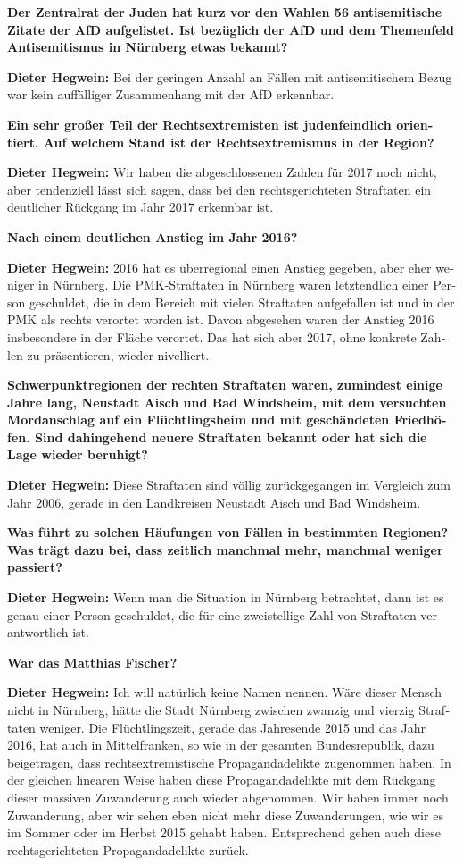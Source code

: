 \begin{otherlanguage}{ngerman}
\textbf{Der Zentralrat der Juden hat kurz vor den Wahlen 56 antisemitische Zitate der AfD aufgelistet. Ist bezüglich der AfD und dem Themenfeld Antisemitismus in Nürnberg etwas bekannt?}

\textbf{Dieter Hegwein:} Bei der geringen Anzahl an Fällen mit antisemitischem Bezug war kein auffälliger Zusammenhang mit der AfD erkennbar. 

\textbf{Ein sehr großer Teil der Rechtsextremisten ist judenfeindlich orientiert. Auf welchem Stand ist der Rechtsextremismus in der Region?}

\textbf{Dieter Hegwein:} Wir haben die abgeschlossenen Zahlen für 2017 noch nicht, aber tendenziell lässt sich sagen, dass bei den rechtsgerichteten Straftaten ein deutlicher Rückgang im Jahr 2017 erkennbar ist.

\textbf{Nach einem deutlichen Anstieg im Jahr 2016?}

\textbf{Dieter Hegwein:} 2016 hat es überregional einen Anstieg gegeben, aber eher weniger in Nürnberg. Die PMK-Straftaten in Nürnberg waren letztendlich einer Person geschuldet, die in dem Bereich mit vielen Straftaten aufgefallen ist und in der PMK als rechts verortet worden ist. Davon abgesehen waren der Anstieg 2016 insbesondere in der Fläche verortet. Das hat sich aber 2017, ohne konkrete Zahlen zu präsentieren, wieder nivelliert.

\textbf{Schwerpunktregionen der rechten Straftaten waren, zumindest einige Jahre lang, Neustadt Aisch und Bad Windsheim, mit dem versuchten Mordanschlag auf ein Flüchtlingsheim und mit geschändeten Friedhöfen. Sind dahingehend neuere Straftaten bekannt oder hat sich die Lage wieder beruhigt?}

\textbf{Dieter Hegwein:} Diese Straftaten sind völlig zurückgegangen im Vergleich zum Jahr 2006, gerade in den Landkreisen Neustadt Aisch und Bad Windsheim.

\textbf{Was führt zu solchen Häufungen von Fällen in bestimmten Regionen? Was trägt dazu bei, dass zeitlich manchmal mehr, manchmal weniger passiert?}

\textbf{Dieter Hegwein:} Wenn man die Situation in Nürnberg betrachtet, dann ist es genau einer Person geschuldet, die für eine zweistellige Zahl von Straftaten verantwortlich ist. 

\textbf{War das Matthias Fischer? }

\textbf{Dieter Hegwein:} Ich will natürlich keine Namen nennen. Wäre dieser Mensch nicht in Nürnberg, hätte die Stadt Nürnberg zwischen zwanzig und vierzig Straftaten weniger. Die Flüchtlingszeit, gerade das Jahresende 2015 und das Jahr 2016, hat auch in Mittelfranken, so wie in der gesamten Bundesrepublik, dazu beigetragen, dass rechtsextremistische Propagandadelikte zugenommen haben. In der gleichen linearen Weise haben diese Propagandadelikte mit dem Rückgang dieser massiven Zuwanderung auch wieder abgenommen. Wir haben immer noch Zuwanderung, aber wir sehen eben nicht mehr diese Zuwanderungen, wie wir es im Sommer oder im Herbst 2015 gehabt haben. Entsprechend gehen auch diese rechtsgerichteten Propagandadelikte zurück.


\end{otherlanguage}
